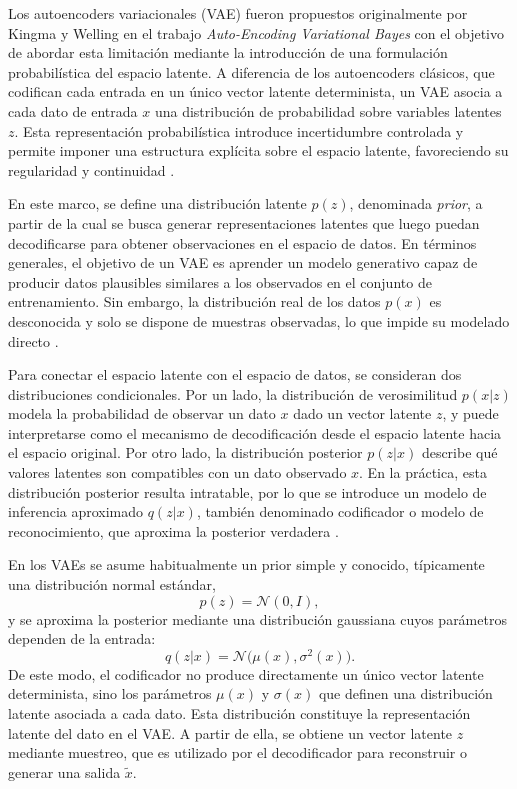 Los autoencoders variacionales (VAE) fueron propuestos originalmente por Kingma y Welling en el trabajo \textit{Auto-Encoding Variational Bayes} \cite{kingma2013auto} con el objetivo de abordar esta limitación mediante la introducción de una formulación probabilística del espacio latente. A diferencia de los autoencoders clásicos, que codifican cada entrada en un único vector latente determinista, un VAE asocia a cada dato de entrada $x$ una distribución de probabilidad sobre variables latentes $z$. Esta representación probabilística introduce incertidumbre controlada y permite imponer una estructura explícita sobre el espacio latente, favoreciendo su regularidad y continuidad \cite{kingma2019introduction}.

En este marco, se define una distribución latente $p(z)$, denominada \textit{prior}, a partir de la cual se busca generar representaciones latentes que luego puedan decodificarse para obtener observaciones en el espacio de datos. En términos generales, el objetivo de un VAE es aprender un modelo generativo capaz de producir datos plausibles similares a los observados en el conjunto de entrenamiento. Sin embargo, la distribución real de los datos $p(x)$ es desconocida y solo se dispone de muestras observadas, lo que impide su modelado directo \cite{kingma2019introduction}.

Para conectar el espacio latente con el espacio de datos, se consideran dos distribuciones condicionales. Por un lado, la distribución de verosimilitud $p(x|z)$ modela la probabilidad de observar un dato $x$ dado un vector latente $z$, y puede interpretarse como el mecanismo de decodificación desde el espacio latente hacia el espacio original. Por otro lado, la distribución posterior $p(z|x)$ describe qué valores latentes son compatibles con un dato observado $x$. En la práctica, esta distribución posterior resulta intratable, por lo que se introduce un modelo de inferencia aproximado $q(z|x)$, también denominado codificador o modelo de reconocimiento, que aproxima la posterior verdadera \cite{kingma2019introduction,doersch2016tutorial}.

En los VAEs se asume habitualmente un prior simple y conocido, típicamente una distribución normal estándar,
\[
p(z) = \mathcal{N}(0, I),
\]
y se aproxima la posterior mediante una distribución gaussiana cuyos parámetros dependen de la entrada:
\[
q(z|x) = \mathcal{N}\big(\mu(x), \sigma^2(x)\big).
\]
De este modo, el codificador no produce directamente un único vector latente determinista, sino los parámetros $\mu(x)$ y $\sigma(x)$ que definen una distribución latente asociada a cada dato. Esta distribución constituye la representación latente del dato en el VAE. A partir de ella, se obtiene un vector latente $z$ mediante muestreo, que es utilizado por el decodificador para reconstruir o generar una salida $\tilde{x}$.


